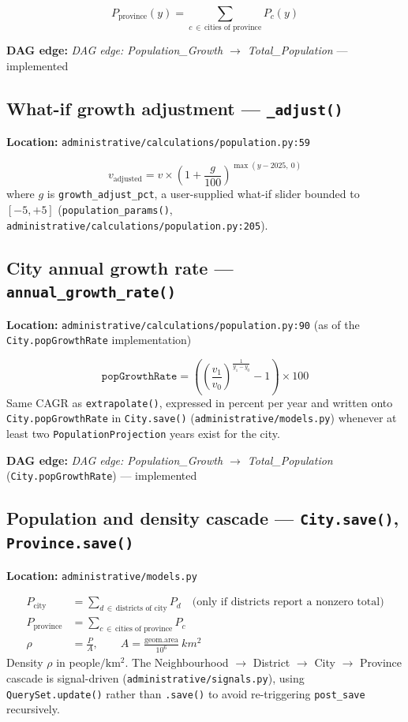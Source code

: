 \documentclass[11pt]{article}
\newcommand{\code}[1]{\texttt{#1}}
\newcommand{\dagedge}[1]{\textit{DAG edge: #1}}
\newcommand{\statusdone}{\textcolor{green!50!black}{implemented}}
\begin{document}
\begin{equation}
  P_{\text{province}}(y) = \sum_{c \,\in\, \text{cities of province}} P_c(y)
\end{equation}

\textbf{DAG edge:} \dagedge{Population\_Growth $\rightarrow$ Total\_Population} --- \statusdone{}

\subsection{What-if growth adjustment --- \code{\_adjust()}}
\textbf{Location:} \code{administrative/calculations/population.py:59}

\begin{equation}
  v_{\text{adjusted}} = v \times \left(1 + \frac{g}{100}\right)^{\max(y - 2025,\ 0)}
\end{equation}
where $g$ is \code{growth\_adjust\_pct}, a user-supplied what-if slider bounded to $[-5, +5]$ (\code{population\_params()}, \code{administrative/calculations/population.py:205}).

\subsection{City annual growth rate --- \code{annual\_growth\_rate()}}
\textbf{Location:} \code{administrative/calculations/population.py:90} (as of the \code{City.popGrowthRate} implementation)

\begin{equation}
  \texttt{popGrowthRate} = \left(\left(\frac{v_1}{v_0}\right)^{\frac{1}{y_1-y_0}} - 1\right) \times 100
\end{equation}
Same CAGR as \code{extrapolate()}, expressed in percent per year and written onto \code{City.popGrowthRate} in \code{City.save()} (\code{administrative/models.py}) whenever at least two \code{PopulationProjection} years exist for the city.

\textbf{DAG edge:} \dagedge{Population\_Growth $\rightarrow$ Total\_Population} (\code{City.popGrowthRate}) --- \statusdone{}

\subsection{Population and density cascade --- \code{City.save()}, \code{Province.save()}}
\textbf{Location:} \code{administrative/models.py}

\begin{align}
  P_{\text{city}} &= \sum_{d \,\in\, \text{districts of city}} P_d \quad \text{(only if districts report a nonzero total)}\\
  P_{\text{province}} &= \sum_{c \,\in\, \text{cities of province}} P_c \\
  \rho &= \frac{P}{A}, \qquad A = \frac{\text{geom.area}}{10^6}\ \si{km^2}
\end{align}
Density $\rho$ in people$/\mathrm{km^2}$. The Neighbourhood $\rightarrow$ District $\rightarrow$ City $\rightarrow$ Province cascade is signal-driven (\code{administrative/signals.py}), using \code{QuerySet.update()} rather than \code{.save()} to avoid re-triggering \code{post\_save} recursively.
\end{document}
